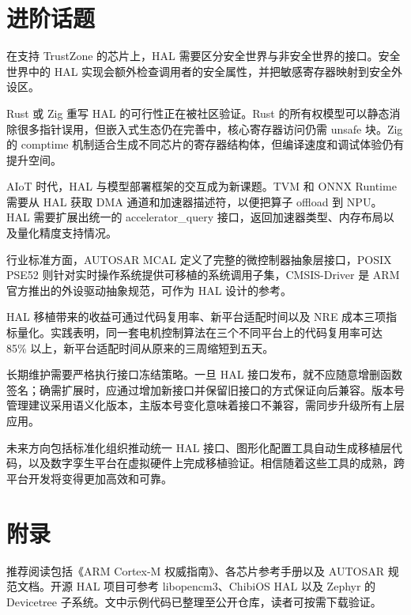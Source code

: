 \chapter{进阶话题}
在支持 TrustZone 的芯片上，HAL 需要区分安全世界与非安全世界的接口。安全世界中的 HAL 实现会额外检查调用者的安全属性，并把敏感寄存器映射到安全外设区。\par
Rust 或 Zig 重写 HAL 的可行性正在被社区验证。Rust 的所有权模型可以静态消除很多指针误用，但嵌入式生态仍在完善中，核心寄存器访问仍需 unsafe 块。Zig 的 comptime 机制适合生成不同芯片的寄存器结构体，但编译速度和调试体验仍有提升空间。\par
AIoT 时代，HAL 与模型部署框架的交互成为新课题。TVM 和 ONNX Runtime 需要从 HAL 获取 DMA 通道和加速器描述符，以便把算子 offload 到 NPU。HAL 需要扩展出统一的 accelerator\_{}query 接口，返回加速器类型、内存布局以及量化精度支持情况。\par
行业标准方面，AUTOSAR MCAL 定义了完整的微控制器抽象层接口，POSIX PSE52 则针对实时操作系统提供可移植的系统调用子集，CMSIS-Driver 是 ARM 官方推出的外设驱动抽象规范，可作为 HAL 设计的参考。\par
HAL 移植带来的收益可通过代码复用率、新平台适配时间以及 NRE 成本三项指标量化。实践表明，同一套电机控制算法在三个不同平台上的代码复用率可达 85\%{} 以上，新平台适配时间从原来的三周缩短到五天。\par
长期维护需要严格执行接口冻结策略。一旦 HAL 接口发布，就不应随意增删函数签名；确需扩展时，应通过增加新接口并保留旧接口的方式保证向后兼容。版本号管理建议采用语义化版本，主版本号变化意味着接口不兼容，需同步升级所有上层应用。\par
未来方向包括标准化组织推动统一 HAL 接口、图形化配置工具自动生成移植层代码，以及数字孪生平台在虚拟硬件上完成移植验证。相信随着这些工具的成熟，跨平台开发将变得更加高效和可靠。\par
\chapter{附录}
推荐阅读包括《ARM Cortex-M 权威指南》、各芯片参考手册以及 AUTOSAR 规范文档。开源 HAL 项目可参考 libopencm3、ChibiOS HAL 以及 Zephyr 的 Devicetree 子系统。文中示例代码已整理至公开仓库，读者可按需下载验证。\par
